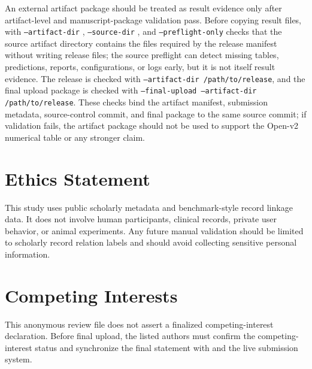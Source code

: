 \documentclass[preprint,12pt]{elsarticle}
\begin{document}
\begin{sloppypar}
An external artifact package should be treated as result evidence only after artifact-level and manuscript-package validation pass. Before copying result files,  with \texttt{--artifact-dir} , \texttt{--source-dir} , and \texttt{--preflight-only} checks that the source artifact directory contains the files required by the release manifest without writing release files; the source preflight can detect missing tables, predictions, reports, configurations, or logs early, but it is not itself result evidence. The release is checked with  \texttt{--artifact-dir /path/to/release}, and the final upload package is checked with  \texttt{--final-upload --artifact-dir /path/to/release}. These checks bind the artifact manifest, submission metadata, source-control commit, and final package to the same source commit; if validation fails, the artifact package should not be used to support the Open-v2 numerical table or any stronger claim.

\end{sloppypar}

\section*{Ethics Statement}

This study uses public scholarly metadata and benchmark-style record linkage data. It does not involve human participants, clinical records, private user behavior, or animal experiments. Any future manual validation should be limited to scholarly record relation labels and should avoid collecting sensitive personal information.

\section*{Competing Interests}

This anonymous review file does not assert a finalized competing-interest declaration. Before final upload, the listed authors must confirm the competing-interest status and synchronize the final statement with  and the live submission system.



\end{document}
